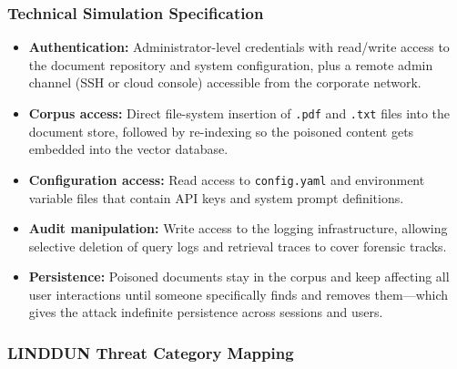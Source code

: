 \subsubsection{Technical Simulation Specification}

\begin{prosebox}
\begin{itemize}[leftmargin=1.4em, itemsep=3pt]
  \item \textbf{Authentication:} Administrator-level credentials with
        read/write access to the document repository and system configuration,
        plus a remote admin channel (SSH or cloud console) accessible from
        the corporate network.
  \item \textbf{Corpus access:} Direct file-system insertion of \texttt{.pdf}
        and \texttt{.txt} files into the document store, followed by
        re-indexing so the poisoned content gets embedded into the vector database.
  \item \textbf{Configuration access:} Read access to \texttt{config.yaml}
        and environment variable files that contain API keys and system prompt
        definitions.
  \item \textbf{Audit manipulation:} Write access to the logging
        infrastructure, allowing selective deletion of query logs and
        retrieval traces to cover forensic tracks.
  \item \textbf{Persistence:} Poisoned documents stay in the corpus and
        keep affecting all user interactions until someone specifically finds
        and removes them---which gives the attack indefinite persistence
        across sessions and users.
\end{itemize}
\end{prosebox}

\subsubsection{LINDDUN Threat Category Mapping}

